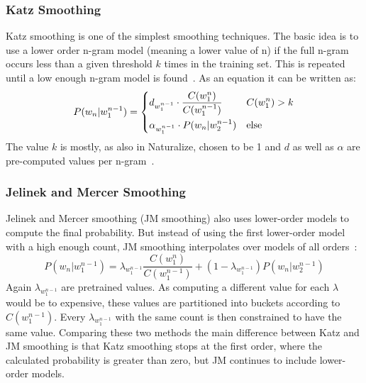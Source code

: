 \subsubsection{Katz Smoothing}
Katz smoothing is one of the simplest smoothing techniques. The basic idea is to use a lower order n-gram model (meaning a lower value of n) if the full n-gram occurs less than a given threshold $k$ times in the training set. This is repeated until a low enough n-gram model is found~\cite{katz1987estimation}. As an equation it can be written as:
\begin{equation}
    P(w_n | w_1^{n-1}) = 
    \begin{dcases}
    d_{w_1^{n-1}}\cdot \frac{C(w_1^n)}{C(w_1^{n-1})} & C(w_1^n) > k\\
    \alpha_{w_1^{n-1}} \cdot P(w_n | w_2^{n-1}) & \text{else}
    \end{dcases}
\end{equation}
The value $k$ is mostly, as also in Naturalize, chosen to be 1 and $d$ as well as $\alpha$ are pre-computed values per n-gram~\cite{katz1987estimation}.
\subsubsection{Jelinek and Mercer Smoothing}
Jelinek and Mercer smoothing (JM smoothing) also uses lower-order models to compute the final probability. But instead of using the first lower-order model with a high enough count, JM smoothing interpolates over models of all orders~\cite{smoothingStudy}:
\begin{equation}
    P(w_n | w_1^{n-1})=\lambda_{w_1^{n-1}}\frac{C(w_1^n)}{C(w_1^{n-1})} + (1-\lambda_{w_1^{n-1}})P(w_n | w_2^{n-1})
\end{equation}
Again $\lambda_{w_1^{n-1}}$ are pretrained values. As computing a different value for each $\lambda$ would be to expensive, these values are partitioned into buckets according to $C(w_1^{n-1})$. Every $\lambda_{w_1^{n-1}}$ with the same count is then constrained to have the same value.
Comparing these two methods the main difference between Katz and JM smoothing is that Katz smoothing stops at the first order, where the calculated probability is greater than zero, but JM continues to include lower-order models.